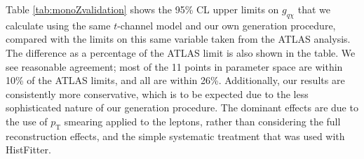 \begin{flushleft}
Table \ref{tab:monoZvalidation} shows the 95\% CL upper limits on $g_{q \chi}$ that we calculate using the same $t$-channel model and our own generation procedure, compared with the limits on this same variable taken from the ATLAS analysis. The difference as a percentage of the ATLAS limit is also shown in the table. We see reasonable agreement; most of the 11 points in parameter space are within 10\% of the ATLAS limits, and all are within 26\%. Additionally, our results are consistently more conservative, which is to be expected due to the less sophisticated nature of our generation procedure. The dominant effects are due to the use of $p_{\mathrm{T}}$ smearing applied to the leptons, rather than considering the full reconstruction effects, and the simple systematic treatment that was used with HistFitter.

\end{flushleft}

\iffalse

\subsection{Mono-W/Z Channel}
\label{monoWZ_validation}
\begin{flushleft}
\comm{Johanna, please put your validation results here.}
\end{flushleft}

\fi

